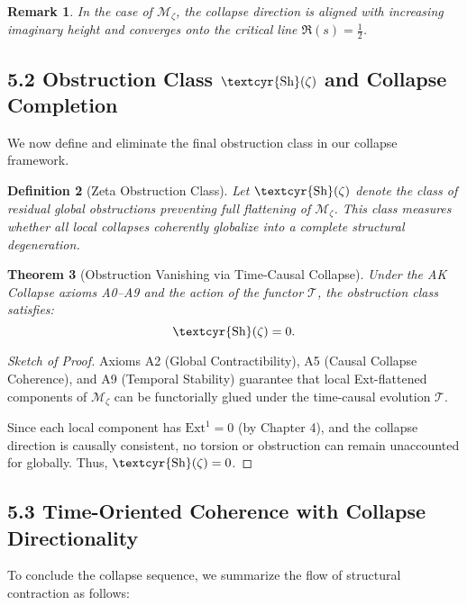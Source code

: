 \documentclass[11pt]{article}
\newtheorem{theorem}{Theorem}[section]
\newtheorem{definition}[theorem]{Definition}
\newtheorem{remark}[theorem]{Remark}
\newcommand{\Sha}{\text{\textcyr{Sh}}}
\begin{document}
\begin{remark}
In the case of $\mathcal{M}_\zeta$, the collapse direction is aligned with increasing imaginary height and converges onto the critical line $\Re(s) = \tfrac{1}{2}$.
\end{remark}

\subsection{5.2 Obstruction Class $\Sha(\zeta)$ and Collapse Completion}

We now define and eliminate the final obstruction class in our collapse framework.

\begin{definition}[Zeta Obstruction Class]
Let $\Sha(\zeta)$ denote the class of residual global obstructions preventing full flattening of $\mathcal{M}_\zeta$.  
This class measures whether all local collapses coherently globalize into a complete structural degeneration.
\end{definition}

\begin{theorem}[Obstruction Vanishing via Time-Causal Collapse]
Under the AK Collapse axioms A0–A9 and the action of the functor $\mathcal{T}$, the obstruction class satisfies:
\[
\Sha(\zeta) = 0.
\]
\end{theorem}

\begin{proof}[Sketch of Proof]
Axioms A2 (Global Contractibility), A5 (Causal Collapse Coherence), and A9 (Temporal Stability)  
guarantee that local Ext-flattened components of $\mathcal{M}_\zeta$ can be functorially glued under the time-causal evolution $\mathcal{T}$.

Since each local component has $\mathrm{Ext}^1 = 0$ (by Chapter 4), and the collapse direction is causally consistent,  
no torsion or obstruction can remain unaccounted for globally. Thus, $\Sha(\zeta) = 0$.
\end{proof}

\subsection{5.3 Time-Oriented Coherence with Collapse Directionality}

To conclude the collapse sequence, we summarize the flow of structural contraction as follows:

\begin{center}
\end{center}
\end{document}
